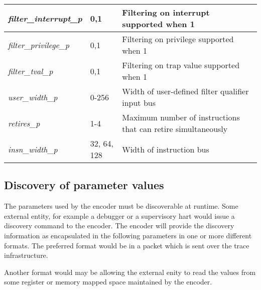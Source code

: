 \begin{table}[h]
\begin{tabulary}{\textwidth}{|l|p{25mm}|p{80mm}|}
        \hline
        \textit {filter\_interrupt\_p} & 0,1 & Filtering on interrupt supported when 1 \\
        \hline
        \textit {filter\_privilege\_p} & 0,1 & Filtering on privilege supported when 1 \\
        \hline
        \textit {filter\_tval\_p} & 0,1 & Filtering on trap value supported when 1 \\
        \hline
        \textit {user\_width\_p} & 0-256 & Width of user-defined filter qualifier input bus \\
        \hline
        \textit {retires\_p} & 1-4 & Maximum number of instructions that can retire simultaneously \\
        \hline
        \textit {insn\_width\_p}	& 32, 64, 128 & Width of instruction bus \\
        \hline
    \end{tabulary}
\end{table}
\FloatBarrier

\subsection {Discovery of parameter values}

The parameters used by the encoder must be discoverable at
runtime. Some external entity, for example a debugger or a supervisory
hart would issue a discovery command to the encoder. The encoder will
provide the discovery information as encapsulated in the following
parameters in one or more different formats.  The preferred format
would be in a packet which is sent over the trace infrastructure.

Another format would may be allowing the external enity to read the
values from some register or memory mapped space maintained by the
encoder.


